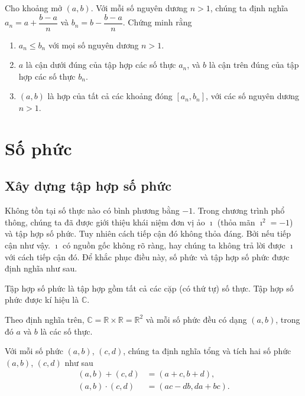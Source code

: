 \begin{exercise}
	Cho khoảng mở $(a, b)$. Với mỗi số nguyên dương $n > 1$, chúng ta định nghĩa $a_{n} = a + \dfrac{b-a}{n}$ và $b_{n} = b - \dfrac{b-a}{n}$. Chứng minh rằng
	\begin{enumerate}[label={(\roman*)}]
		\item $a_{n}\leq b_{n}$ với mọi số nguyên dương $n > 1$.
		\item $a$ là cận dưới đúng của tập hợp các số thực $a_{n}$, và $b$ là cận trên đúng của tập hợp các số thực $b_{n}$.
		\item $(a, b)$ là hợp của tất cả các khoảng đóng $[a_{n}, b_{n}]$, với các số nguyên dương $n > 1$.
	\end{enumerate}
\end{exercise}

\section{Số phức}

\subsection{Xây dựng tập hợp số phức}

Không tồn tại số thực nào có bình phương bằng $-1$. Trong chương trình phổ thông, chúng ta đã được giới thiệu khái niệm đơn vị ảo $\imath$ (thỏa mãn $\imath^{2} = -1$) và tập hợp số phức. Tuy nhiên cách tiếp cận đó không thỏa đáng. Bởi nếu tiếp cận như vậy. $\imath$ có nguồn gốc không rõ ràng, hay chúng ta không trả lời được $\imath$ với cách tiếp cận đó. Để khắc phục điều này, số phức và tập hợp số phức được định nghĩa như sau.
\begin{definition}
	Tập hợp số phức là tập hợp gồm tất cả các cặp (có thứ tự) số thực. Tập hợp số phức được kí hiệu là $\mathbb{C}$.
\end{definition}

Theo định nghĩa trên, $\mathbb{C} = \mathbb{R}\times\mathbb{R} = \mathbb{R}^{2}$ và mỗi số phức đều có dạng $(a, b)$, trong đó $a$ và $b$ là các số thực.

\begin{definition}
	Với mỗi số phức $(a, b)$, $(c, d)$, chúng ta định nghĩa tổng và tích hai số phức $(a, b)$, $(c, d)$ như sau
	\begin{align*}
		(a, b) + (c, d)    & = (a + c, b + d),     \\
		(a, b)\cdot (c, d) & = (ac - db, da + bc).
	\end{align*}
\end{definition}

